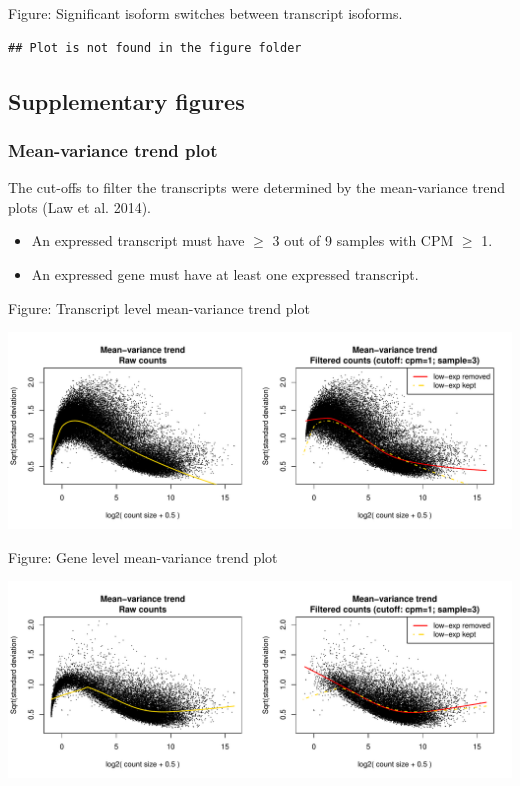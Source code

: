 \documentclass[]{article}
\providecommand{\tightlist}{%
  \setlength{\itemsep}{0pt}\setlength{\parskip}{0pt}}
\begin{document}
Figure: Significant isoform switches between transcript isoforms.

\begin{verbatim}
## Plot is not found in the figure folder
\end{verbatim}

\subsection{Supplementary figures}\label{supplementary-figures}

\subsubsection{Mean-variance trend plot}\label{mean-variance-trend-plot}

The cut-offs to filter the transcripts were determined by the
mean-variance trend plots (Law et al. 2014).

\begin{itemize}
\tightlist
\item
  An expressed transcript must have \(\geq\) 3 out of 9 samples with CPM
  \(\geq\) 1.
\item
  An expressed gene must have at least one expressed transcript.
\end{itemize}

Figure: Transcript level mean-variance trend plot

\includegraphics[width=23.96in]{X2024.08.05.11.24.04.j284/figure/Transcript mean-variance trend}

Figure: Gene level mean-variance trend plot

\includegraphics[width=23.96in]{X2024.08.05.11.24.04.j284/figure/Gene mean-variance trend}
\end{document}
